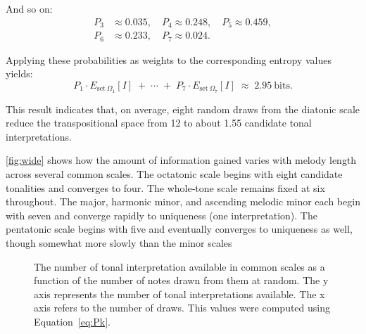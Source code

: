\documentclass[10pt,twocolumn]{article}
\numberwithin{equation}{section} %
\begin{document}
And so on:
\begin{align*}
P_3 &\approx 0.035, \quad
P_4 \approx 0.248, \quad
P_5 \approx 0.459, \\
P_6 &\approx 0.233, \quad
P_7 \approx 0.024.
\end{align*}

Applying these probabilities as weights to the corresponding entropy values yields:
\[
P_1 \cdot E_{\text{set}~\Omega_1}[I] \;+\; \cdots \;+\; P_7 \cdot E_{\text{set}~\Omega_7}[I]
\;\approx\; 2.95 \ \text{bits}.
\]

This result indicates that, on average,
eight random draws from the diatonic scale reduce the transpositional space
from 12 to about 1.55 candidate tonal interpretations.

\autoref{fig:wide} shows how the amount of information
gained varies with melody length across several common scales. The octatonic
scale begins with eight candidate tonalities and converges to four. The whole‑tone
scale remains fixed at six throughout. The major, harmonic minor, and ascending
melodic minor each begin with seven and converge rapidly to uniqueness (one
interpretation). The pentatonic scale begins with five and eventually converges
to uniqueness as well, though somewhat more slowly than the minor scales

\begin{figure}[htbp]
\centering
{}
\caption{The number of
tonal interpretation available in common scales as a function of the number of
notes drawn from them at random. The y axis represents the number of tonal
interpretations available. The x axis refers to the number of draws. This
values were computed using Equation~\ref{eq:Pk}.}
\label{fig:wide}
\end{figure}
\end{document}
